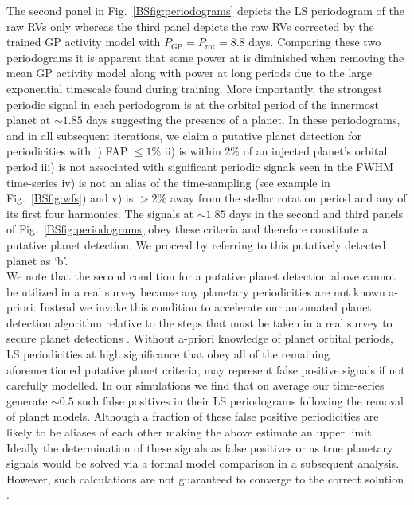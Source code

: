 The second panel in Fig.~\ref{BSfig:periodograms} depicts the LS periodogram of the raw RVs only whereas
the third panel depicts the raw RVs corrected by the trained GP activity model with
$P_{\text{GP}}=P_{\text{rot}}=8.8$ days. Comparing these two periodograms it is apparent
that some power at \prot{} is diminished when removing the mean GP activity model
along with power at long periods due to the large exponential
timescale found during training. More importantly, the strongest periodic signal in each periodogram is
at the orbital period of the innermost planet at $\sim 1.85$ days suggesting the presence of a
planet. In these periodograms, and in all subsequent iterations, we claim a putative planet detection
for periodicities with i) FAP $\leq 1$\% ii) is within 2\% of an injected planet's orbital period iii)
is not associated with significant
periodic signals seen in the FWHM time-series iv) is not an alias of the time-sampling (see example in
Fig.~\ref{BSfig:wfs})
and v) is $>2$\% away from the stellar rotation period and any of its first four harmonics. The signals
at $\sim 1.85$ days in the second and third panels of Fig.~\ref{BSfig:periodograms} obey these criteria and
therefore constitute a putative planet detection. We proceed by referring to this putatively
detected planet as `b'. \\

We note that the second condition for a putative planet detection above cannot be utilized in a real survey
because any planetary periodicities are not known a-priori. Instead we invoke this condition to
accelerate our automated planet detection algorithm relative to the steps that must be taken in a real survey
to secure planet detections \citep[e.g. Bayesian model comparison;][]{ford07}.
Without a-priori knowledge of planet orbital periods, LS periodicities at high
significance that obey all of the remaining aforementioned putative planet criteria, may represent false positive
signals if not carefully modelled.
In our simulations we find that on average our time-series generate $\sim 0.5$ such false positives in their LS
periodograms following the removal of planet models. Although
a fraction of these false positive periodicities are likely to be aliases of each other making the above
estimate an upper limit. Ideally the determination of these signals as false positives or as true planetary
signals would be solved via a formal model comparison in a subsequent analysis. However, such calculations are
not guaranteed to converge to the correct solution \citep[see][]{dumusque17}. \\

